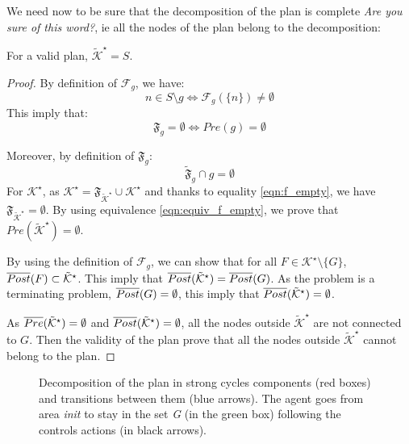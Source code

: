 We need now to be sure that the decomposition of the plan is complete \textit{Are you sure of this word?}, ie all the nodes of the plan belong to the decomposition:
\begin{prop}
For a valid plan, $\tilde{\mathcal{K}}^\star = S$.
\end{prop}
\begin{proof}

By definition of $\mathcal{F}_g$, we have:
\begin{equation}
n \in S \setminus g \Leftrightarrow \mathcal{F}_g(\{n\}) \neq \emptyset
\end{equation}
This imply that:
\begin{equation} \label{eqn:equiv_f_empty}
\mathfrak{F}_g = \emptyset \Leftrightarrow Pre(g) = \emptyset
\end{equation}

Moreover, by definition of $\mathfrak{F}_g$:
\begin{equation} \label{eqn:f_empty}
\tilde{\mathfrak{F}}_g \cap g = \emptyset
\end{equation}
For $\mathcal{K}^\star$, as $\mathcal{K}^\star = \mathfrak{F}_{\tilde{\mathcal{K}}^\star} \cup \mathcal{K}^\star$ and thanks to equality \ref{eqn:f_empty}, we have $\mathfrak{F}_{\tilde{\mathcal{K}}^\star} = \emptyset$.  
By using equivalence \ref{eqn:equiv_f_empty}, we prove that $Pre(\tilde{\mathcal{K}}^\star) = \emptyset$.

By using the definition of $\mathcal{F}_g$,
we can show that for all $F \in \mathcal{K}^\star \setminus \{G\}$, $\overline{Post} (F) \subset \tilde{\mathcal{K}}^\star$.
This imply that $\overline{Post} (\tilde{\mathcal{K}}^\star) = \overline{Post} (G)$.
As the problem is a terminating problem, $\overline{Post} (G) = \emptyset$, this imply that 
$\overline{Post} (\tilde{\mathcal{K}}^\star)  = \emptyset$.

As $\overline{Pre} (\tilde{\mathcal{K}}^\star)  = \emptyset$ and $\overline{Post} (\tilde{\mathcal{K}}^\star)  = \emptyset$, all the nodes outside $\tilde{\mathcal{K}}^\star$ are not connected to $G$.
Then the validity of the plan prove that all the nodes outside   $\tilde{\mathcal{K}}^\star$ cannot belong to the plan.
\end{proof}


\begin{figure}
	\center
	
	\caption{Decomposition of the plan in strong cycles components (red boxes) and transitions between them (blue arrows). The agent goes from area \textit{init} to stay in the set \textit{G} (in the green box) following the controls actions (in black arrows).}
	\label{fig:environment}
\end{figure}

